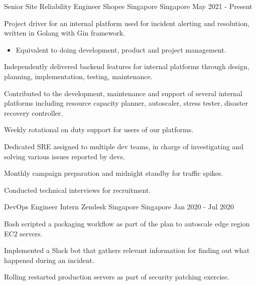 

\begin{cventries}

  \cventry
    {Senior Site Reliability Engineer} %
    {Shopee Singapore} %
    {Singapore} %
    {May 2021 - Present} %
    {
      \begin{cvitems} %
        \item {Project driver for an internal platform used for incident alerting and resolution, written in Golang with Gin framework.}
        \begin{itemize}
          \item{Equivalent to doing development, product and project management.}
        \end{itemize}
        \item {Independently delivered backend features for internal platforms through design, planning, implementation, testing, maintenance.}
        \item {Contributed to the development, maintenance and support of several internal platforms including resource capacity planner, autoscaler, stress tester, disaster recovery controller.}
        \item {Weekly rotational on duty support for users of our platforms.}
        \item {Dedicated SRE assigned to multiple dev teams, in charge of investigating and solving various issues reported by devs.}
        \item {Monthly campaign preparation and midnight standby for traffic spikes.}
        \item {Conducted technical interviews for recruitment.}
      \end{cvitems}
    }

  \cventry
    {DevOps Engineer Intern} %
    {Zendesk Singapore} %
    {Singapore} %
    {Jan 2020 - Jul 2020} %
    {
      \begin{cvitems} %
        \item {Bash scripted a packaging workflow as part of the plan to autoscale edge region EC2 servers.}
        \item {Implemented a Slack bot that gathers relevant information for finding out what happened during an incident.}
        \item {Rolling restarted production servers as part of security patching exercise.}
      \end{cvitems}
    }


\end{cventries}
